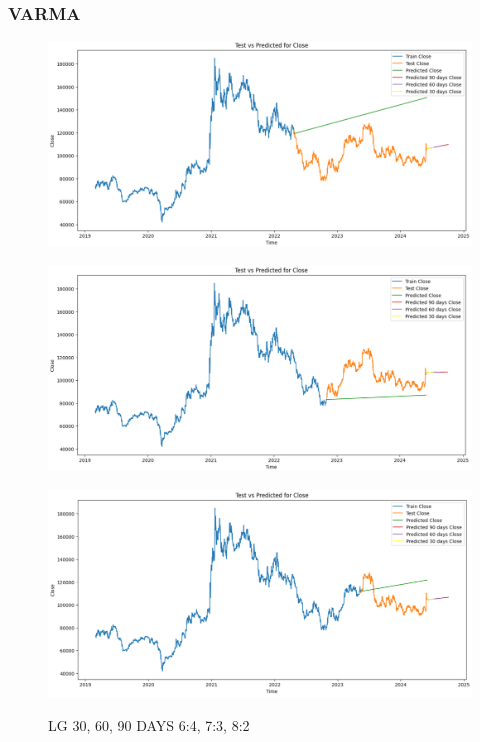 \documentclass[conference]{IEEEtran}
\begin{document}
\subsubsection{VARMA}

\begin{figure}[H]
    \centering
    \begin{minipage}{0.15\textwidth}
    \centering
    \includegraphics[width=1\textwidth]{Image/VARMA/LG/6_4.png}
   
    \label{fig:1}
    \end{minipage}%
    \begin{minipage}{0.15\textwidth}
    \centering
    \includegraphics[width=1\textwidth]{Image/VARMA/LG/7_3.png}
  
    \label{fig:2}
    \end{minipage}%
    \begin{minipage}{0.15\textwidth}
    \centering
    \includegraphics[width=1\textwidth]{Image/VARMA/LG/8_2.png}

    \label{fig:3}
    \end{minipage}
    \caption{ LG 30, 60, 90 DAYS  6:4, 7:3, 8:2 }
\end{figure}
\end{document}
